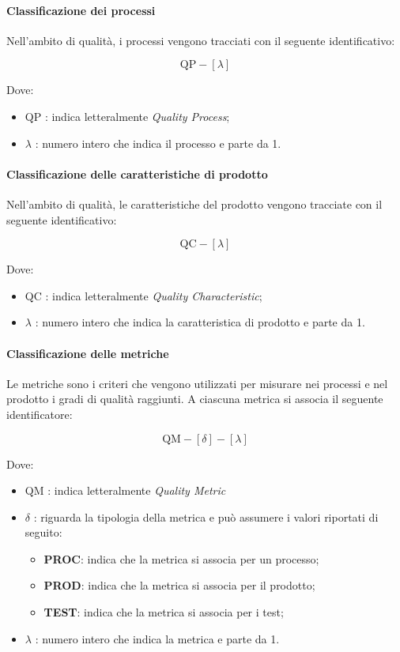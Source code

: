 		\paragraph{Classificazione dei processi}

		Nell'ambito di qualità, i processi vengono tracciati con il seguente identificativo:

		\[
				\text{QP}-[\lambda]
		\]

		Dove:

		\begin{itemize}
			\item QP : indica letteralmente \textit{Quality Process};
			\item \(\lambda\) : numero intero che indica il processo e parte da 1.
		\end{itemize}

		\paragraph{Classificazione delle caratteristiche di prodotto}

		Nell'ambito di qualità, le caratteristiche del prodotto vengono tracciate con il seguente identificativo:

		\[
				\text{QC}-[\lambda]
		\]

		Dove:

		\begin{itemize}
			\item QC : indica letteralmente \textit{Quality Characteristic};
			\item \(\lambda\) : numero intero che indica la caratteristica di prodotto e parte da 1.
		\end{itemize}

		\paragraph{Classificazione delle metriche}

		Le metriche sono i criteri che vengono utilizzati per misurare nei processi e nel prodotto i gradi di qualità raggiunti. A ciascuna metrica si associa il seguente identificatore:

		\[
				\text{QM}-[\delta]-[\lambda]
		\]

		Dove:

		\begin{itemize}
			\item QM : indica letteralmente \textit{Quality Metric}
			\item \(\delta\) : riguarda la tipologia della metrica e può assumere i valori riportati di seguito:
				\begin{itemize}
					\item \textbf{PROC}: indica che la metrica si associa per un processo;
					\item \textbf{PROD}: indica che la metrica si associa per il prodotto;
					\item \textbf{TEST}: indica che la metrica si associa per i test;
				\end{itemize}
			\item \(\lambda\) : numero intero che indica la metrica e parte da 1.
		\end{itemize}


